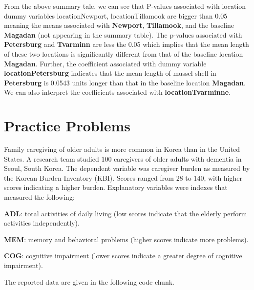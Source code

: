 \documentclass[
]{book}
\begin{document}
From the above summary tale, we can see that P-values associated with location dummy variables locationNewport, locationTillamook are bigger than 0.05 meaning the means associated with \textbf{Newport}, \textbf{Tillamook}, and the baseline \textbf{Magadan} (not appearing in the summary table). The p-values associated with \textbf{Petersburg} and \textbf{Tvarminn} are less the 0.05 which implies that the mean length of these two locations is significantly different from that of the baseline location \textbf{Magadan}. Further, the coefficient associated with dummy variable \textbf{locationPetersburg} indicates that the mean length of mussel shell in \textbf{Petersburg} is 0.0543 units longer than that in the baseline location \textbf{Magadan}. We can also interpret the coefficients associated with \textbf{locationTvarminne}.\\

\hypertarget{practice-problems-2}{%
\section{Practice Problems}\label{practice-problems-2}}

Family caregiving of older adults is more common in Korea than in the United States. A research team studied 100 caregivers of older adults with dementia in Seoul, South Korea. The dependent variable was caregiver burden as measured by the Korean Burden Inventory (KBI). Scores ranged from 28 to 140, with higher scores indicating a higher burden. Explanatory variables were indexes that measured the following:

\textbf{ADL}: total activities of daily living (low scores indicate that the elderly perform activities
independently).

\textbf{MEM}: memory and behavioral problems (higher scores indicate more problems).

\textbf{COG}: cognitive impairment (lower scores indicate a greater degree of cognitive impairment).

The reported data are given in the following code chunk.

\hfill\break
\end{document}
